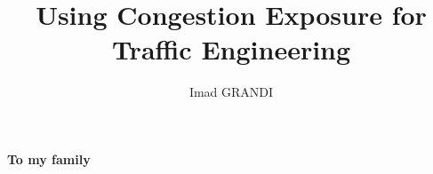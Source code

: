 \documentclass[mres]{ucl_thesis}
\title{Using Congestion Exposure for Traffic Engineering}
\author{Imad GRANDI}
\begin{document}
\maketitle

\clearpage
\clearpage
\fontsize{12}{15}
\selectfont
\begin{center}
\textbf{}
\end{center}
\clearpage
\begin{center}
\textbf{To my family}
\end{center}




\setcounter{tocdepth}{2}
\tableofcontents
\listoffigures

\cleardoublepage













\end{document}

